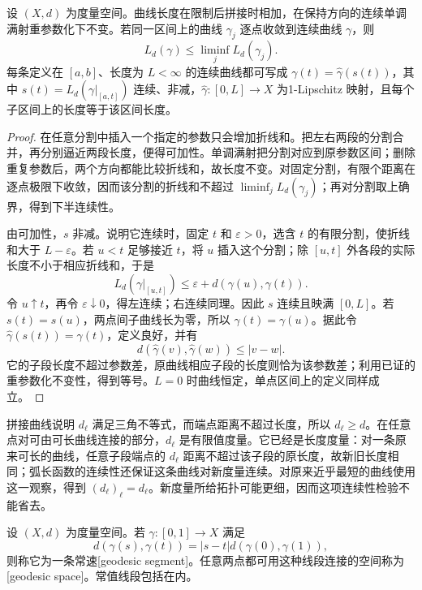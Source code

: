 \begin{proposition}\label{g3:prop:metric-length-properties}
	设 \((X,d)\) 为度量空间。曲线长度在限制后拼接时相加，在保持方向的连续单调满射重参数化下不变。若同一区间上的曲线 \(\gamma_j\) 逐点收敛到连续曲线 \(\gamma\)，则
	\[
		L_d(\gamma)\le\liminf_jL_d(\gamma_j).
	\]
	每条定义在 \([a,b]\)、长度为 \(L<\infty\) 的连续曲线都可写成 \(\gamma(t)=\widehat\gamma(s(t))\)，其中 \(s(t)=L_d(\gamma|_{[a,t]})\) 连续、非减，\(\widehat\gamma:[0,L]\to X\) 为1-Lipschitz 映射，且每个子区间上的长度等于该区间长度。
\end{proposition}
\begin{proof}
	在任意分割中插入一个指定的参数只会增加折线和。把左右两段的分割合并，再分别逼近两段长度，便得可加性。单调满射把分割对应到原参数区间；删除重复参数后，两个方向都能比较折线和，故长度不变。对固定分割，有限个距离在逐点极限下收敛，因而该分割的折线和不超过 \(\liminf_jL_d(\gamma_j)\)；再对分割取上确界，得到下半连续性。

	由可加性，\(s\) 非减。说明它连续时，固定 \(t\) 和 \(\varepsilon>0\)，选含 \(t\) 的有限分割，使折线和大于 \(L-\varepsilon\)。若 \(u<t\) 足够接近 \(t\)，将 \(u\) 插入这个分割；除 \([u,t]\) 外各段的实际长度不小于相应折线和，于是
	\[
		L_d(\gamma|_{[u,t]})\le\varepsilon+d(\gamma(u),\gamma(t)).
	\]
	令 \(u\uparrow t\)，再令 \(\varepsilon\downarrow0\)，得左连续；右连续同理。因此 \(s\) 连续且映满 \([0,L]\)。若 \(s(t)=s(u)\)，两点间子曲线长为零，所以 \(\gamma(t)=\gamma(u)\)。据此令 \(\widehat\gamma(s(t))=\gamma(t)\)，定义良好，并有
	\[
		d(\widehat\gamma(v),\widehat\gamma(w))\le|v-w|.
	\]
	它的子段长度不超过参数差，原曲线相应子段的长度则恰为该参数差；利用已证的重参数化不变性，得到等号。\(L=0\) 时曲线恒定，单点区间上的定义同样成立。
\end{proof}

拼接曲线说明 \(d_\ell\) 满足三角不等式，而端点距离不超过长度，所以 \(d_\ell\ge d\)。在任意点对可由可长曲线连接的部分，\(d_\ell\) 是有限值度量。它已经是长度度量：对一条原来可长的曲线，任意子段端点的 \(d_\ell\) 距离不超过该子段的原长度，故新旧长度相同；弧长函数的连续性还保证这条曲线对新度量连续。对原来近乎最短的曲线使用这一观察，得到 \((d_\ell)_\ell=d_\ell\)。新度量所给拓扑可能更细，因而这项连续性检验不能省去。

\begin{definition}\label{g3:def:metric-geodesic-space}
	设 \((X,d)\) 为度量空间。若 \(\gamma:[0,1]\to X\) 满足
	\[
		d(\gamma(s),\gamma(t))=|s-t|d(\gamma(0),\gamma(1)),
	\]
	则称它为一条常速[geodesic segment]。任意两点都可用这种线段连接的空间称为[geodesic space]。常值线段包括在内。
\end{definition}

